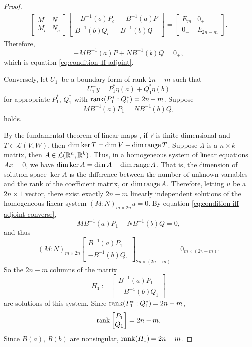 \documentclass[11pt, oneside, a4paper]{article}
\begin{document}
\begin{proof}
    \begin{align*}
        \begin{bmatrix}
            M & N\\
            M_c & N_c
        \end{bmatrix}
        \begin{bmatrix}
            -B^{-1}(a)P_c & -B^{-1}(a)P\\
            B^{-1}(b)Q_c & B^{-1}(b)Q
        \end{bmatrix}
        =
        \begin{bmatrix}
            E_m & 0_+\\
            0_- & E_{2n-m}
        \end{bmatrix}.
    \end{align*}
    Therefore,
    \[-MB^{-1}(a)P + NB^{-1}(b)Q = 0_+,\]
    which is equation \eqref{eq:condition iff adjoint}.

    Conversely, let $U_1^+$ be a boundary form of rank $2n-m$ such that
    \[U_1^+y = P_1^*\eta(a) + Q_1^*\eta(b)\]
    for appropriate $P_1^*$, $Q_1^*$ with $\operatorname{rank}(P_1^*:Q_1^*)=2n-m$. Suppose
    \begin{equation}\label{eq:condition iff adjoint converse}
        MB^{-1}(a)P_1 = NB^{-1}(b)Q_1
    \end{equation}
    holds.

    By the fundamental theorem of linear maps \cite[p.63]{Axler1997}, if $V$ is finite-dimensional and $T\in\mathcal{L}(V, W)$, then $\dim\ker T = \dim V - \dim \operatorname{range} T$. Suppose $A$ is a $n\times k$ matrix, then $A\in\mathcal{L}(\mathbb R^n, \mathbb R^k)$. Thus, in a homogeneous system of linear equations $Ax=0$, we have $\dim \ker A = \dim A - \dim \operatorname{range} A$. That is, the dimension of solution space $\ker A$ is the difference between the number of unknown variables and the rank of the coefficient matrix, or $\dim\operatorname{range} A$. Therefore, letting $u$ be a $2n\times 1$ vector, there exist exactly $2n-m$ linearly independent solutions of the homogeneous linear system $(M:N)_{m\times 2n}u=0$. By equation \eqref{eq:condition iff adjoint converse},
    \[MB^{-1}(a)P_1 - NB^{-1}(b)Q=0,\]
    and thus
    \[(M:N)_{m\times 2n}\begin{bmatrix}
        B^{-1}(a)P_1\\
        -B^{-1}(b)Q_1
    \end{bmatrix}_{2n\times (2n-m)} = 0_{m\times (2n-m)}.\]
    So the $2n-m$ columns of the matrix
    \[H_1:= \begin{bmatrix}
        B^{-1}(a)P_1\\
        -B^{-1}(b)Q_1
    \end{bmatrix}\]
    are solutions of this system. Since $\operatorname{rank}(P_1^*:Q_1^*)=2n-m$,
    \[\operatorname{rank}\begin{bmatrix}P_1\\ Q_1\end{bmatrix}=2n-m.\]
    Since $B(a)$, $B(b)$ are nonsingular, $\operatorname{rank}(H_1)=2n-m$.


\end{proof}
\end{document}
